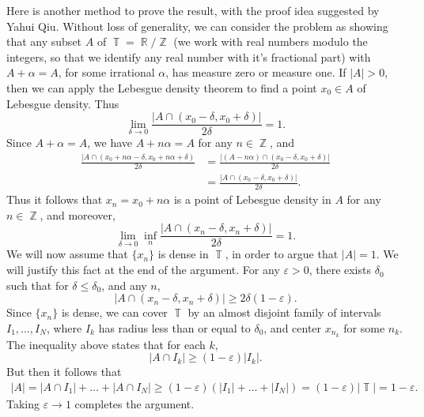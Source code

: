 \documentclass[answers]{exam}
\DeclareMathOperator{\RR}{\mathbb{R}}
\DeclareMathOperator{\ZZ}{\mathbb{Z}}
\DeclareMathOperator{\TT}{\mathbb{T}}
\begin{document}
\begin{questions}
\begin{solution}
	Here is another method to prove the result, with the proof idea suggested by Yahui Qiu. Without loss of generality, we can consider the problem as showing that any subset $A$ of $\TT = \RR / \ZZ$ (we work with real numbers modulo the integers, so that we identify any real number with it's fractional part) with $A + \alpha = A$, for some irrational $\alpha$, has measure zero or measure one. If $|A| > 0$, then we can apply the Lebesgue density theorem to find a point $x_0 \in A$ of Lebesgue density. Thus
	\[ \lim_{\delta \to 0} \frac{|A \cap (x_0 - \delta, x_0 + \delta)|}{2 \delta} = 1. \]
	Since $A + \alpha = A$, we have $A + n\alpha = A$ for any $n \in \ZZ$, and
	\begin{align*}
		\frac{|A \cap (x_0 + n \alpha - \delta, x_0 + n \alpha + \delta)}{2 \delta} &= \frac{|(A - n \alpha) \cap (x_0 - \delta, x_0 + \delta)|}{2 \delta}\\
		&= \frac{|A \cap (x_0 - \delta, x_0 + \delta)|}{2 \delta}.
	\end{align*}
	Thus it follows that $x_n = x_0 + n \alpha$ is a point of Lebesgue density in $A$ for any $n \in \ZZ$, and moreover,
	\[ \lim_{\delta \to 0} \inf_n \frac{|A \cap (x_n - \delta, x_n + \delta)|}{2 \delta} = 1. \]
	We will now assume that $\{ x_n \}$ is dense in $\TT$, in order to argue that $|A| = 1$. We will justify this fact at the end of the argument. For any $\varepsilon > 0$, there exists $\delta_0$ such that for $\delta \leq \delta_0$, and any $n$,
	\[  |A \cap (x_n - \delta, x_n + \delta)| \geq 2 \delta (1 - \varepsilon). \]
	Since $\{ x_n \}$ is dense, we can cover $\TT$ by an almost disjoint family of intervals $I_1,\dots,I_N$, where $I_k$ has radius less than or equal to $\delta_0$, and center $x_{n_k}$ for some $n_k$. The inequality above states that for each $k$,
	\[ |A \cap I_k| \geq (1 - \varepsilon) |I_k|. \]
	But then it follows that
	\begin{align*}
		|A| = |A \cap I_1| + \dots + |A \cap I_N| \geq (1 - \varepsilon) (|I_1| + \dots + |I_N|) = (1 - \varepsilon) |\TT| = 1 - \varepsilon.
	\end{align*}
	Taking $\varepsilon \to 1$ completes the argument.


\end{solution}
\end{questions}
\end{document}
